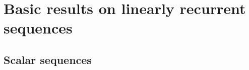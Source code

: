\documentclass[12pt]{article}
\begin{document}


\section{Basic results on linearly recurrent sequences}


\subsection{Scalar sequences} \label{section:linseq}
\end{document}

